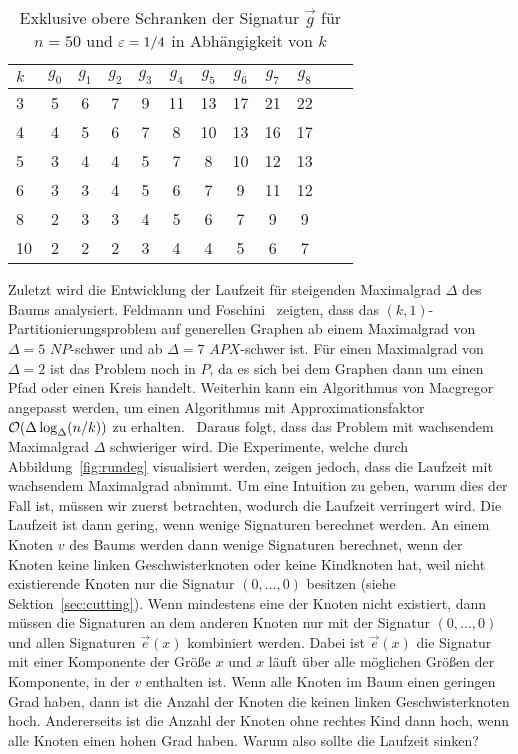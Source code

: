 \begin{table}
    \centering
    \begin{tabular}{l*{11}{c}}
        \toprule
        $k$ & $g_0$ & $g_1$ & $g_2$ & $g_3$ & $g_4$ & $g_5$ & $g_6$ & $g_7$ & $g_8$ \\
        \midrule
        3 & 5 & 6 & 7 & 9 & 11 & 13 & 17 & 21 & 22 \\
        4 & 4 & 5 & 6 & 7 & 8 & 10 & 13 & 16 & 17 \\
        5 & 3 & 4 & 4 & 5 & 7 & 8 & 10 & 12 & 13 \\ 
        6 & 3 & 3 & 4 & 5 & 6 & 7 & 9 & 11 & 12 \\ 
        8 & 2 & 3 & 3 & 4 & 5 & 6 & 7 & 9 & 9 \\ 
        10 & 2 & 2 & 2 & 3 & 4 & 4 & 5 & 6 & 7 \\ 
        \bottomrule
    \end{tabular}
    \caption{Exklusive obere Schranken der Signatur $\vec{g}$ für $n=50$ und $\varepsilon=1/4$ in Abhängigkeit von $k$}\label{tab:ksig}
\end{table}

Zuletzt wird die Entwicklung der Laufzeit für steigenden Maximalgrad $\Delta$ des Baums analysiert.
Feldmann und Foschini~\cite{FF15} zeigten, dass das $(k, 1)$\hyp Partitionierungsproblem auf generellen Graphen ab einem Maximalgrad von $\Delta=5$ $NP$\hyp schwer und ab $\Delta=7$ $APX$-schwer ist.
Für einen Maximalgrad von $\Delta=2$ ist das Problem noch in $P$, da es sich bei dem Graphen dann um einen Pfad oder einen Kreis handelt.
Weiterhin kann ein Algorithmus von Macgregor~\cite{mcg78} angepasst werden, um einen Algorithmus mit Approximationsfaktor $\mathcal{O}(\Delta \log_\Delta(n/k))$ zu erhalten.~\cite{FF15}
Daraus folgt, dass das Problem mit wachsendem Maximalgrad $\Delta$ schwieriger wird.
Die Experimente, welche durch Abbildung~\ref{fig:rundeg} visualisiert werden, zeigen jedoch, dass die Laufzeit mit wachsendem Maximalgrad abnimmt.
Um eine Intuition zu geben, warum dies der Fall ist, müssen wir zuerst betrachten, wodurch die Laufzeit verringert wird.
Die Laufzeit ist dann gering, wenn wenige Signaturen berechnet werden.
An einem Knoten $v$ des Baums werden dann wenige Signaturen berechnet, wenn der Knoten keine linken Geschwisterknoten oder keine Kindknoten hat, weil nicht existierende Knoten nur die Signatur $(0, \ldots, 0)$ besitzen (siehe Sektion~\ref{sec:cutting}).
Wenn mindestens eine der Knoten nicht existiert, dann müssen die Signaturen an dem anderen Knoten nur mit der Signatur $(0, \ldots, 0)$ und allen Signaturen $\vec{e}(x)$ kombiniert werden.
Dabei ist $\vec{e}(x)$ die Signatur mit einer Komponente der Größe $x$ und $x$ läuft über alle möglichen Größen der Komponente, in der $v$ enthalten ist.
Wenn alle Knoten im Baum einen geringen Grad haben, dann ist die Anzahl der Knoten die keinen linken Geschwisterknoten hoch. 
Andererseits ist die Anzahl der Knoten ohne rechtes Kind dann hoch, wenn alle Knoten einen hohen Grad haben.
Warum also sollte die Laufzeit sinken?

